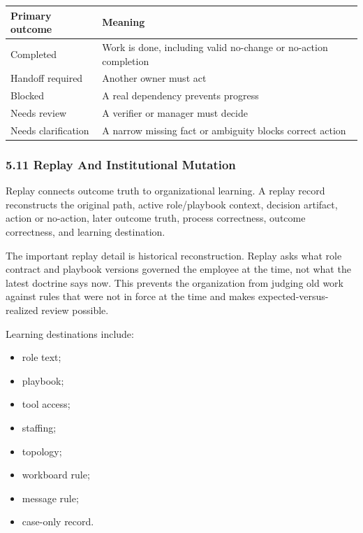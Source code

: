 \documentclass[
]{article}
\newcounter{none} %
\providecommand{\tightlist}{%
  \setlength{\itemsep}{0pt}\setlength{\parskip}{0pt}}
\begin{document}
{\def\LTcaptype{none} %
\begin{longtable}[]{@{}
  >{\raggedright\arraybackslash}p{}
  >{\raggedright\arraybackslash}p{}@{}}
\toprule\noalign{}
\begin{minipage}[b]{\linewidth}\raggedright
Primary outcome
\end{minipage} & \begin{minipage}[b]{\linewidth}\raggedright
Meaning
\end{minipage} \\
\midrule\noalign{}
\endhead
\bottomrule\noalign{}
\endlastfoot
Completed & Work is done, including valid no-change or no-action completion \\
Handoff required & Another owner must act \\
Blocked & A real dependency prevents progress \\
Needs review & A verifier or manager must decide \\
Needs clarification & A narrow missing fact or ambiguity blocks correct action \\
\end{longtable}
}

\subsubsection{5.11 Replay And Institutional Mutation}\label{replay-and-institutional-mutation}

Replay connects outcome truth to organizational learning. A replay record reconstructs the original path, active role/playbook context, decision artifact, action or no-action, later outcome truth, process correctness, outcome correctness, and learning destination.

The important replay detail is historical reconstruction. Replay asks what role contract and playbook versions governed the employee at the time, not what the latest doctrine says now. This prevents the organization from judging old work against rules that were not in force at the time and makes expected-versus-realized review possible.

Learning destinations include:

\begin{itemize}
\tightlist
\item
  role text;
\item
  playbook;
\item
  tool access;
\item
  staffing;
\item
  topology;
\item
  workboard rule;
\item
  message rule;
\item
  case-only record.
\end{itemize}
\end{document}
